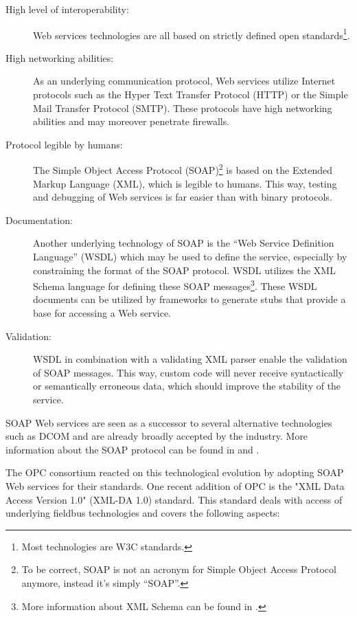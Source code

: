 \begin{description}
\item[High level of interoperability:] Web services technologies are
all based on strictly defined open standards\footnote{Most
technologies are W3C standards.}.
\item[High networking abilities:] As an underlying communication
protocol, Web services utilize Internet protocols such as the Hyper
Text Transfer Protocol (HTTP) or the Simple Mail Transfer Protocol
(SMTP). These protocols have high networking abilities and may
moreover penetrate firewalls.
\item[Protocol legible by humans:] The Simple Object Access Protocol
(SOAP)\footnote{To be correct, SOAP is not an acronym for Simple
Object Access Protocol anymore, instead it's simply ``SOAP''.} is based
on the Extended Markup Language (XML), which is legible to
humans. This way, testing and debugging of Web services is far easier
than with binary protocols.
\item[Documentation:] Another underlying technology of SOAP is the
``Web Service Definition Language'' (WSDL) which may be used to define
the service, especially by constraining the format of the SOAP
protocol. WSDL utilizes the XML Schema language for defining these
SOAP messages\footnote{More information about XML Schema can be found
in \cite{XSD1}.}. These WSDL documents can be utilized by frameworks
to generate stubs that provide a base for accessing a Web service.
\item[Validation:] WSDL in combination with a validating XML parser
enable the validation of SOAP messages. This way, custom code will
never receive syntactically or semantically erroneous data, which
should improve the stability of the service.
\end{description}

SOAP Web services are seen as a successor to several alternative
technologies such as DCOM and are already broadly accepted by the
industry. More information about the SOAP protocol can be found in
\cite{SOAP1} and \cite{SOAP2}.

The OPC consortium reacted on this technological evolution by adopting
SOAP Web services for their standards. One recent addition of OPC is
the "XML Data Access Version 1.0" (XML-DA 1.0) standard. This standard
deals with access of underlying fieldbus technologies and covers the
following aspects:

